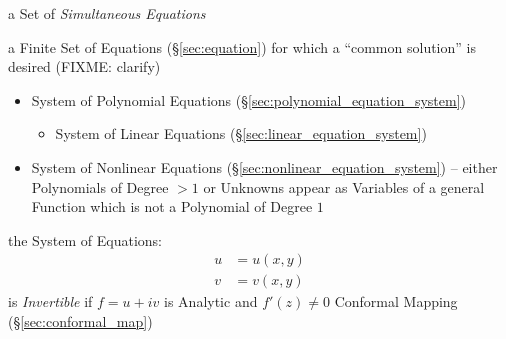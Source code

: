 a Set of \emph{Simultaneous Equations}

a Finite Set of Equations (\S\ref{sec:equation}) for which a ``common
solution'' is desired (FIXME: clarify)

\begin{itemize}
  \item System of Polynomial Equations (\S\ref{sec:polynomial_equation_system})
  \begin{itemize}
    \item System of Linear Equations (\S\ref{sec:linear_equation_system})
  \end{itemize}
  \item System of Nonlinear Equations
    (\S\ref{sec:nonlinear_equation_system}) -- either Polynomials of Degree
    $>1$ or Unknowns appear as Variables of a general Function which is not a
    Polynomial of Degree $1$
\end{itemize}


the System of Equations:
\begin{align*}
  u & = u(x,y) \\
  v & = v(x,y)
\end{align*}
is \emph{Invertible} if $f = u + iv$ is Analytic and $f'(z) \neq 0$ \fist
Conformal Mapping (\S\ref{sec:conformal_map})

